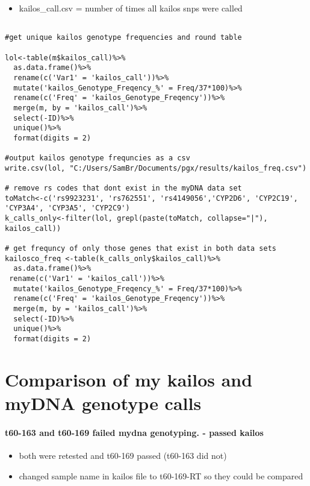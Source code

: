\documentclass[]{article}
\providecommand{\tightlist}{%
  \setlength{\itemsep}{0pt}\setlength{\parskip}{0pt}}
\let\oldparagraph\paragraph
\renewcommand{\paragraph}[1]{\oldparagraph{#1}\mbox{}}
\begin{document}
\begin{itemize}
\tightlist
\item
  kailos\_call.csv = number of times all kailos snps were called
\end{itemize}

\begin{verbatim}

#get unique kailos genotype frequencies and round table

lol<-table(m$kailos_call)%>%
  as.data.frame()%>%
  rename(c('Var1' = 'kailos_call'))%>%
  mutate('kailos_Genotype_Freqency_%' = Freq/37*100)%>%
  rename(c('Freq' = 'kailos_Genotype_Freqency'))%>%
  merge(m, by = 'kailos_call')%>%
  select(-ID)%>%
  unique()%>%
  format(digits = 2)

#output kailos genotype frequncies as a csv
write.csv(lol, "C:/Users/SamBr/Documents/pgx/results/kailos_freq.csv")

# remove rs codes that dont exist in the myDNA data set
toMatch<-c('rs9923231', 'rs762551', 'rs4149056','CYP2D6', 'CYP2C19', 'CYP3A4', 'CYP3A5', 'CYP2C9')
k_calls_only<-filter(lol, grepl(paste(toMatch, collapse="|"), kailos_call))

# get frequncy of only those genes that exist in both data sets 
kailosco_freq <-table(k_calls_only$kailos_call)%>%
  as.data.frame()%>%
 rename(c('Var1' = 'kailos_call'))%>%
  mutate('kailos_Genotype_Freqency_%' = Freq/37*100)%>%
  rename(c('Freq' = 'kailos_Genotype_Freqency'))%>%
  merge(m, by = 'kailos_call')%>%
  select(-ID)%>%
  unique()%>%
  format(digits = 2) 
\end{verbatim}

\section{Comparison of my kailos and myDNA genotype
calls}\label{comparison-of-my-kailos-and-mydna-genotype-calls}

\paragraph{t60-163 and t60-169 failed mydna genotyping. - passed
kailos}\label{t60-163-and-t60-169-failed-mydna-genotyping.---passed-kailos}

\begin{itemize}
\tightlist
\item
  both were retested and t60-169 passed (t60-163 did not)
\item
  changed sample name in kailos file to t60-169-RT so they could be
  compared\\
\end{itemize}
\end{document}
